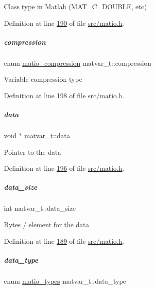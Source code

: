 Class type in Matlab (M\+A\+T\+\_\+\+C\+\_\+\+D\+O\+U\+B\+LE, etc) 

Definition at line \hyperlink{src_2matio_8h_source_l00190}{190} of file \hyperlink{src_2matio_8h_source}{src/matio.\+h}.

\mbox{\label{group___m_a_t_aeef0466048621cb2c959ba7f6c774d06}} 
\subparagraph{\texorpdfstring{compression}{compression}}
{\footnotesize\ttfamily enum \hyperlink{group___m_a_t_ga768c318af97bd2567758ecb001ceb7f4}{matio\+\_\+compression} matvar\+\_\+t\+::compression}

Variable compression type 

Definition at line \hyperlink{src_2matio_8h_source_l00198}{198} of file \hyperlink{src_2matio_8h_source}{src/matio.\+h}.

\mbox{\label{group___m_a_t_a5672978efa230bbdecdf38ede781f7fa}} 
\subparagraph{\texorpdfstring{data}{data}}
{\footnotesize\ttfamily void $\ast$ matvar\+\_\+t\+::data}

Pointer to the data 

Definition at line \hyperlink{src_2matio_8h_source_l00196}{196} of file \hyperlink{src_2matio_8h_source}{src/matio.\+h}.

\mbox{\label{group___m_a_t_a9ad1c82e2b568da617e12dc73a26e1f9}} 
\subparagraph{\texorpdfstring{data\+\_\+size}{data\_size}}
{\footnotesize\ttfamily int matvar\+\_\+t\+::data\+\_\+size}

Bytes / element for the data 

Definition at line \hyperlink{src_2matio_8h_source_l00189}{189} of file \hyperlink{src_2matio_8h_source}{src/matio.\+h}.

\mbox{\label{group___m_a_t_ab6aafe9bd77f0f077852593dec438144}} 
\subparagraph{\texorpdfstring{data\+\_\+type}{data\_type}}
{\footnotesize\ttfamily enum \hyperlink{group___m_a_t_gacf7b3b879282b7ab3a51190e49bf3453}{matio\+\_\+types} matvar\+\_\+t\+::data\+\_\+type}

